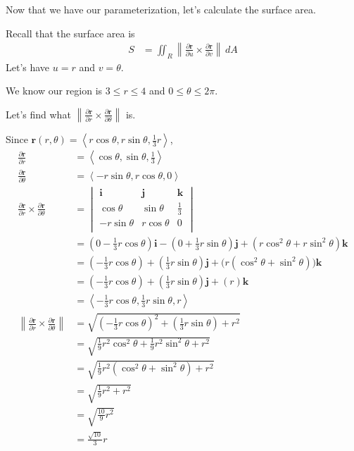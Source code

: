 \documentclass{article}
\newcommand{\lrp}[1]{\left( #1 \right)}
\newcommand{\lra}[1]{\left\langle #1 \right\rangle}
\newcommand{\norm}[1]{\left\lVert #1 \right\rVert}
\renewcommand{\i}[0]{\mathbf{i}}
\renewcommand{\j}[0]{\mathbf{j}}
\renewcommand{\k}[0]{\mathbf{k}}
\renewcommand{\r}[0]{\mathbf{r}}
\begin{document}
Now that we have our parameterization, let's calculate the surface area.

Recall that the surface area is
\begin{align*}
    S&=\iint_R \norm{\frac{\partial \r}{\partial u}\times \frac{\partial \r}{\partial v}}\,dA
\end{align*}
Let's have $u=r$ and $v=\theta$.

We know our region is $3\leq r\leq 4$ and $0\leq \theta\leq 2\pi$.

Let's find what $\displaystyle\norm{\frac{\partial \r}{\partial r}\times \frac{\partial \r}{\partial \theta}} $ is.

Since $\displaystyle \r(r,\theta)=\lra{r\cos\theta, r\sin\theta, \frac{1}{3}r}$,
\begin{align*}
    \frac{\partial \r}{\partial r}&=\lra{\cos\theta, \sin\theta, \frac{1}{3}}\\
    \frac{\partial \r}{\partial \theta}&=\lra{-r\sin\theta, r\cos\theta, 0}\\
    \frac{\partial \r}{\partial r}\times \frac{\partial \r}{\partial \theta}&=\begin{vmatrix}
\mathbf{i} & \mathbf{j} & \mathbf{k}\\
\cos\theta & \sin\theta & \frac{1}{3}\\
-r\sin\theta& r\cos\theta & 0\\
\end{vmatrix}\\
&=\lrp{0-\frac{1}{3}r\cos\theta}\i -\lrp{0+\frac{1}{3}r\sin\theta}\j+\lrp{r\cos^2\theta+r\sin^2\theta}\k\\
&=\lrp{-\frac{1}{3}r\cos\theta}+\lrp{\frac{1}{3}r\sin\theta}\j+\Big(r\lrp{\cos^2\theta+\sin^2\theta}\Big)\k\\
&=\lrp{-\frac{1}{3}r\cos\theta}+\lrp{\frac{1}{3}r\sin\theta}\j+\lrp{r}\k\tag{$\cos^2\theta+\sin^2\theta=1$}\\
&=\lra{-\frac{1}{3}r\cos\theta,\frac{1}{3}r\sin\theta,r}\\
\norm{\frac{\partial \r}{\partial r}\times \frac{\partial \r}{\partial \theta}}&=\sqrt{\lrp{-\frac{1}{3}r\cos\theta}^2+\lrp{\frac{1}{3}r\sin\theta}+r^2}\\
&=\sqrt{\frac{1}{9}r^2\cos^2\theta+\frac{1}{9}r^2\sin^2\theta+r^2}\\
&=\sqrt{\frac{1}{9}r^2\lrp{\cos^2\theta+\sin^2\theta}+r^2}\\
&=\sqrt{\frac{1}{9}r^2+r^2}\tag{$\cos^2\theta+\sin^2\theta=1$}\\
&=\sqrt{\frac{10}{9}r^2}\\
&=\frac{\sqrt{10}}{3}r
\end{align*}
\end{document}
